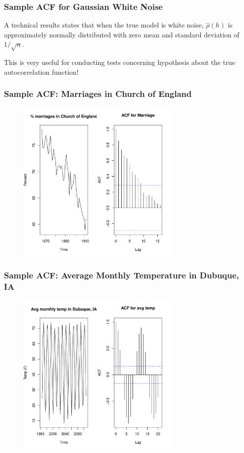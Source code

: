 \documentclass[%
xcolor=pdftex]{beamer}
\begin{document}
\begin{frame}
\frametitle{Sample ACF for Gaussian White Noise}

A technical results states that when the true model is white noise, $\hat{\rho}(h)$ is approximately normally distributed with zero mean and standard deviation of $1/\sqrt{n}$.
\newline

This is very useful for conducting tests concerning hypothesis about the true autocorrelation function!

\end{frame}


\begin{frame}
\frametitle{Sample ACF: Marriages in Church of England}

\includegraphics[width=100mm, height=80mm]{pics/acf_marriage.pdf}

\end{frame}

\begin{frame}
\frametitle{Sample ACF: Average Monthly Temperature in Dubuque, IA}

\includegraphics[width=100mm, height=80mm]{pics/acf_dubuque.pdf}

\end{frame}
\end{document}
